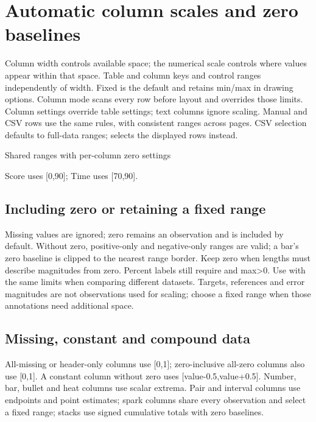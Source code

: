 \section{Automatic column scales and zero baselines}
\label{sec:column-scale}
Column width controls available space; the numerical scale controls where values
appear within that space. Table and column keys  and
 control ranges independently of width.
Fixed is the default and retains min/max in drawing options. Column mode scans
every row before layout and overrides those limits. Column settings override
table settings; text columns ignore scaling. Manual and CSV rows use the same
rules, with consistent ranges across pages. CSV selection defaults to full-data
ranges;  selects the displayed rows instead.
\begin{demo}{Shared ranges with per-column zero settings}
\begin{gradtable}[width=\linewidth,scale=column,include zero=false,header align=c]
\end{gradtable}
\end{demo}
Score uses [0,90]; Time uses [70,90].
\subsection{Including zero or retaining a fixed range}
Missing values are ignored; zero remains an observation and is included by
default. Without zero, positive-only and negative-only ranges are valid; a bar's
zero baseline is clipped to the nearest range border. Keep zero when lengths
must describe magnitudes from zero. Percent labels still require  and max>0.
Use  with the same limits when comparing different datasets. Targets,
references and error magnitudes are not observations used for scaling; choose a
fixed range when those annotations need additional space.
\subsection{Missing, constant and compound data}
All-missing or header-only columns use [0,1]; zero-inclusive all-zero columns
also use [0,1]. A constant column without zero uses [value-0.5,value+0.5].
Number, bar, bullet and heat columns use scalar extrema. Pair and interval
columns use endpoints and point estimates; spark columns share every observation
and select a fixed range; stacks use signed cumulative totals with zero baselines.

